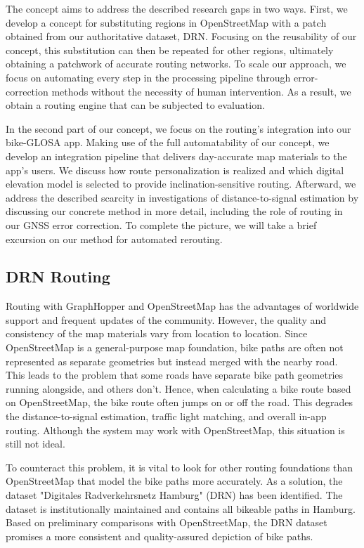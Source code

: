 The concept aims to address the described research gaps in two ways. First, we develop a concept for substituting regions in OpenStreetMap with a patch obtained from our authoritative dataset, DRN. Focusing on the reusability of our concept, this substitution can then be repeated for other regions, ultimately obtaining a patchwork of accurate routing networks. To scale our approach, we focus on automating every step in the processing pipeline through error-correction methods without the necessity of human intervention. As a result, we obtain a routing engine that can be subjected to evaluation.

In the second part of our concept, we focus on the routing's integration into our bike-GLOSA app. Making use of the full automatability of our concept, we develop an integration pipeline that delivers day-accurate map materials to the app's users. We discuss how route personalization is realized and which digital elevation model is selected to provide inclination-sensitive routing. Afterward, we address the described scarcity in investigations of distance-to-signal estimation by discussing our concrete method in more detail, including the role of routing in our GNSS error correction. To complete the picture, we will take a brief excursion on our method for automated rerouting.

\subsection{DRN Routing}

Routing with GraphHopper and OpenStreetMap has the advantages of worldwide support and frequent updates of the community. However, the quality and consistency of the map materials vary from location to location. Since OpenStreetMap is a general-purpose map foundation, bike paths are often not represented as separate geometries but instead merged with the nearby road. This leads to the problem that some roads have separate bike path geometries running alongside, and others don't. Hence, when calculating a bike route based on OpenStreetMap, the bike route often jumps on or off the road. This degrades the distance-to-signal estimation, traffic light matching, and overall in-app routing. Although the system may work with OpenStreetMap, this situation is still not ideal.

To counteract this problem, it is vital to look for other routing foundations than OpenStreetMap that model the bike paths more accurately. As a solution, the dataset "Digitales Radverkehrsnetz Hamburg" (DRN) has been identified. The dataset is institutionally maintained and contains all bikeable paths in Hamburg. Based on preliminary comparisons with OpenStreetMap, the DRN dataset promises a more consistent and quality-assured depiction of bike paths.

